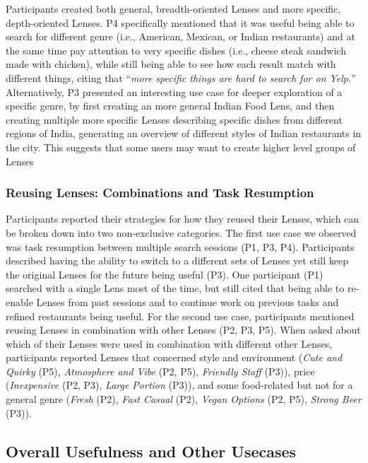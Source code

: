 \documentclass{sigchi}
\begin{document}
Participants created both general, breadth-oriented Lenses and more specific, depth-oriented Lenses. P4 specifically mentioned that it was useful being able to search for different genre (i.e., American, Mexican, or Indian restaurants) and at the same time pay attention to very specific dishes (i.e., cheese steak sandwich made with chicken), while still being able to see how each result match with different things, citing that ``\emph{more specific things are hard to search for on Yelp.}'' Alternatively, P3 presented an interesting use case for deeper exploration of a specific genre, by first creating an more general Indian Food Lens, and then creating multiple more specific Lenses describing specific dishes from different regions of India, generating an overview of different styles of Indian restaurants in the city. This suggests that some users may want to create higher level groups of Lenses

\subsubsection{Reusing Lenses: Combinations and Task Resumption}

Participants reported their strategies for how they reused their Lenses, which can be broken down into two non-exclusive categories. The first use case we observed was task resumption between multiple search sessions (P1, P3, P4). Participants described having the ability to switch to a different sets of Lenses yet still keep the original Lenses for the future being useful (P3). One participant (P1) searched with a single Lens most of the time, but still cited that being able to re-enable Lenses from past sessions and to continue work on previous tasks and refined restaurants being useful. For the second use case, participants mentioned reusing Lenses in combination with other Lenses (P2, P3, P5). When asked about which of their Lenses were used in combination with different other Lenses, participants reported Lenses that concerned style and environment (\emph{Cute and Quirky} (P5), \emph{Atmosphere and Vibe} (P2, P5), \emph{Friendly Staff} (P3)), price (\emph{Inexpensive} (P2, P3), \emph{Large Portion} (P3)), and some food-related but not for a general genre (\emph{Fresh} (P2), \emph{Fast Casual} (P2), \emph{Vegan Options} (P2, P5), \emph{Strong Beer} (P3)).

\subsection{Overall Usefulness and Other Usecases}
\end{document}
